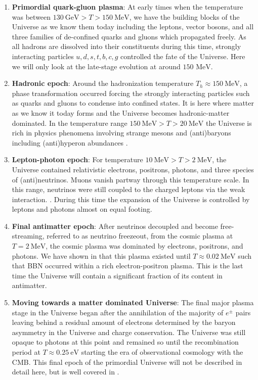 \documentclass[universe,article,submit,moreauthors,pdftex,a4paper]{Definitions/mdpi}
\newcommand{\MeV}{\text{ MeV}}
\begin{document}
\begin{enumerate}
  \item \textbf{Primordial quark-gluon plasma}: At early times when the temperature was between $130\ \mathrm{GeV}>T>150\ \mathrm{MeV}$, we have the building blocks of the Universe as we know them today including the leptons, vector bosons, and all three families of de-confined quarks and gluons which propagated freely. As all hadrons are dissolved into their constituents during this time, strongly interacting particles $u,d,s,t,b,c,g$ controlled the fate of the Universe. Here we will only look at the late-stage evolution at around $150\MeV$.
  \item \textbf{Hadronic epoch}: Around the hadronization temperature $T_h\approx150\ \mathrm{MeV}$, a phase transformation occurred forcing the strongly interacting particles such as quarks and gluons to condense into confined states. It is here where matter as we know it today forms and the Universe becomes hadronic-matter dominated. In the temperature range $ 150\ \mathrm{MeV}>T>20\ \mathrm{MeV}$ the Universe is rich in physics phenomena involving strange mesons and (anti)baryons including (anti)hyperon abundances \cite{Fromerth:2012fe,Yang:2021bko}.
  \item  \textbf{Lepton-photon epoch}: For temperature $10\ \mathrm{MeV}>T>2\ \mathrm{MeV}$, the Universe contained relativistic electrons, positrons, photons, and three species of (anti)neutrinos. Muons vanish partway through this temperature scale. In this range, neutrinos were still coupled to the charged leptons via the weak interaction. \cite{Birrell:2012gg}. During this time the expansion of the Universe is controlled by leptons and photons almost on equal footing.
  \item  \textbf{Final antimatter epoch}: After neutrinos decoupled and become free-streaming, referred to as neutrino freezeout, from the cosmic plasma at $T=2\ \mathrm{MeV}$, the cosmic plasma was dominated by electrons, positrons, and photons. We have shown in \cite{Chris:2023abc} that this plasma existed until $T\approx0.02\ \mathrm{MeV}$ such that BBN occurred within a rich electron-positron plasma. This is the last time the Universe will contain a significant fraction of its content in antimatter.
  \item \textbf{Moving towards a matter dominated Universe}: The final major plasma stage in the Universe began after the annihilation of the majority of $e^{\pm}$ pairs leaving behind a residual amount of electrons determined by the baryon asymmetry in the Universe and charge conservation. The Universe was still opaque to photons at this point and remained so until the recombination period at $T\approx0.25\ \mathrm{eV}$ starting the era of observational cosmology with the CMB. This final epoch of the primordial Universe will not be described in detail here, but is well covered in \cite{Planck:2018vyg}.
\end{enumerate}
\end{document}
